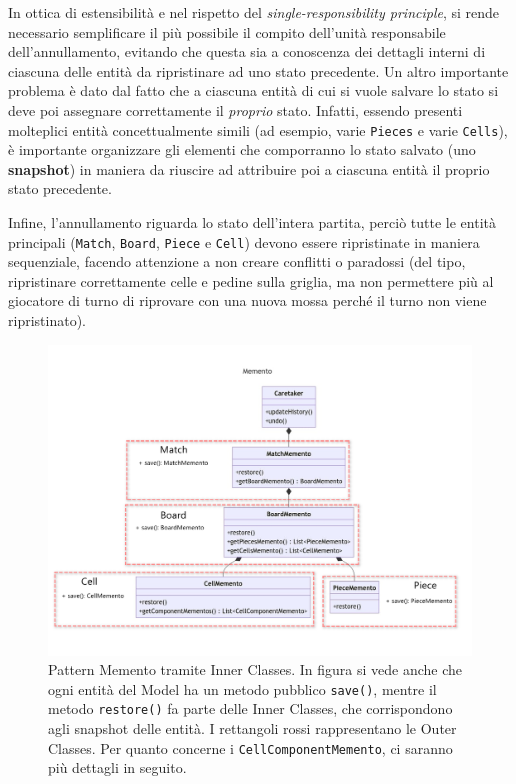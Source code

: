 \documentclass[a4paper,12pt]{report}
\begin{document}
In ottica di estensibilità e nel rispetto del \textit{single-responsibility principle}, si rende necessario semplificare il più possibile il compito dell'unità responsabile dell'annullamento, evitando che questa sia a conoscenza dei dettagli interni di ciascuna delle entità da ripristinare ad uno stato precedente. Un altro importante problema è dato dal fatto che a ciascuna entità di cui si vuole salvare lo stato si deve poi assegnare correttamente il \textit{proprio} stato. Infatti, essendo presenti molteplici entità concettualmente simili (ad esempio, varie \texttt{Pieces} e varie \texttt{Cells}), è importante organizzare gli elementi che comporranno lo stato salvato (uno \textbf{snapshot}) in maniera da riuscire ad attribuire poi a ciascuna entità il proprio stato precedente.

Infine, l'annullamento riguarda lo stato dell'intera partita, perciò tutte le entità principali (\texttt{Match}, \texttt{Board}, \texttt{Piece} e \texttt{Cell}) devono essere ripristinate in maniera sequenziale, facendo attenzione a non creare conflitti o paradossi (del tipo, ripristinare correttamente celle e pedine sulla griglia, ma non permettere più al giocatore di turno di riprovare con una nuova mossa perché il turno non viene ripristinato).

\begin{figure}[H]
	\centering
	\includegraphics[width=\textwidth]{images/memento.png}
	\caption{Pattern Memento tramite Inner Classes. In figura si vede anche che ogni entità del Model ha un metodo pubblico \texttt{save()}, mentre il metodo \texttt{restore()} fa parte delle Inner Classes, che corrispondono agli snapshot delle entità. I rettangoli rossi rappresentano le Outer Classes. Per quanto concerne i \texttt{CellComponentMemento}, ci saranno più dettagli in seguito.}
	\label{images:memento}
\end{figure}
\end{document}
